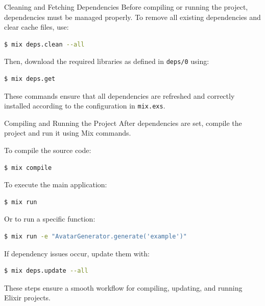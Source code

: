 \documentclass[aspectratio=169, table]{beamer}
\begin{document}
\begin{frame}[fragile]{Cleaning and Fetching Dependencies}
\vspace{20pt}
\small
Before compiling or running the project, dependencies must be managed properly.  
To remove all existing dependencies and clear cache files, use:

\begin{lstlisting}[language=bash, basicstyle=\ttfamily\scriptsize]
$ mix deps.clean --all
\end{lstlisting}

Then, download the required libraries as defined in \texttt{deps/0} using:

\begin{lstlisting}[language=bash, basicstyle=\ttfamily\scriptsize]
$ mix deps.get
\end{lstlisting}

These commands ensure that all dependencies are refreshed and correctly installed  
according to the configuration in \texttt{mix.exs}.
\end{frame}


\begin{frame}[fragile]{Compiling and Running the Project}
\vspace{20pt}
\small
After dependencies are set, compile the project and run it using Mix commands.

To compile the source code:
\begin{lstlisting}[language=bash, basicstyle=\ttfamily\scriptsize]
$ mix compile
\end{lstlisting}

To execute the main application:
\begin{lstlisting}[language=bash, basicstyle=\ttfamily\scriptsize]
$ mix run
\end{lstlisting}

Or to run a specific function:
\begin{lstlisting}[language=bash, basicstyle=\ttfamily\scriptsize]
$ mix run -e "AvatarGenerator.generate('example')"
\end{lstlisting}

If dependency issues occur, update them with:
\begin{lstlisting}[language=bash, basicstyle=\ttfamily\scriptsize]
$ mix deps.update --all
\end{lstlisting}

These steps ensure a smooth workflow for compiling, updating, and running Elixir projects.
\end{frame}
\end{document}
